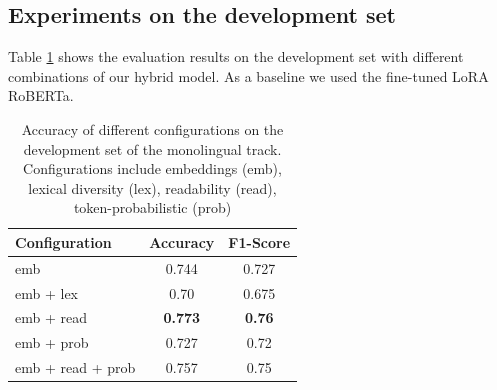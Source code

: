 \documentclass[11pt]{article}
\begin{document}
\subsection{Experiments on the development set}
Table \ref{tab:Accuracy} shows the evaluation results on the development set with different combinations of our hybrid model. 
As a baseline we used the fine-tuned LoRA RoBERTa.
\begin{table}[ht]
    \centering
    \begin{tabular}{l c c}
    \hline
    \textbf{Configuration} & \textbf{Accuracy} & \textbf{F1-Score} \\
    \hline
    emb & 0.744 & 0.727 \\
    
    emb + lex & 0.70 & 0.675 \\
    
    emb + read & \textbf{0.773} & \textbf{0.76} \\
    
    emb + prob & 0.727 & 0.72 \\ 
    
    emb + read + prob & 0.757 & 0.75 \\
    \hline
    \end{tabular}
    \caption{Accuracy of different configurations on the development set of the monolingual track.
    Configurations include embeddings (emb), lexical diversity (lex), readability (read), token-probabilistic (prob)}
    \label{tab:Accuracy}
\end{table}
\end{document}
